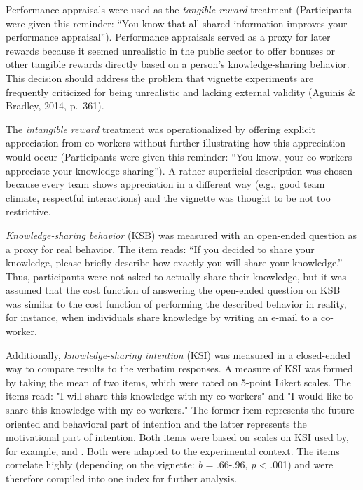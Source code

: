 \documentclass{article}
\begin{document}
Performance appraisals were used as the \emph{tangible reward }treatment (Participants were given this reminder: “You know that all shared information improves your performance appraisal”). Performance appraisals served as a proxy for later rewards because it seemed unrealistic in the public sector to offer bonuses or other tangible rewards directly based on a person's knowledge-sharing behavior. This decision should address the problem that vignette experiments are frequently criticized for being unrealistic and lacking external validity (Aguinis \& Bradley, 2014, p. 361).

The \emph{intangible reward} treatment was operationalized by offering explicit appreciation from co-workers without further illustrating how this appreciation would occur (Participants were given this reminder: “You know, your co-workers appreciate your knowledge sharing”). A rather superficial description was chosen because every team shows appreciation in a different way (e.g., good team climate, respectful interactions) and the vignette was thought to be not too restrictive.

\emph{Knowledge-sharing behavior} (KSB) was measured with an open-ended question as a proxy for real behavior. The item reads: “If you decided to share your knowledge, please briefly describe how exactly you will share your knowledge.” Thus, participants were not asked to actually share their knowledge, but it was assumed that the cost function of answering the open-ended question on KSB was similar to the cost function of performing the described behavior in reality, for instance, when individuals share knowledge by writing an e-mail to a co-worker. 

Additionally, \emph{knowledge-sharing intention} (KSI) was measured in a closed-ended way to compare results to the verbatim responses. A measure of KSI was formed by taking the mean of two items, which were rated on 5-point Likert scales. The items read: "I will share this knowledge with my co-workers" and "I would like to share this knowledge with my co-workers." The former item represents the future-oriented and behavioral part of intention and the latter represents the motivational part of intention. Both items were based on scales on KSI used by, for example, \parencite{Bock2002} and \parencite{Lin2007}. Both were adapted to the experimental context. The items correlate highly (depending on the vignette: \emph{b }= .66-.96, \emph{p} < .001) and were therefore compiled into one index for further analysis. 
\end{document}
